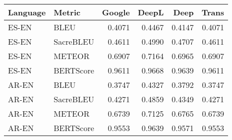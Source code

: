 \begin{table}[ht]
\centering
\begin{tabular}{llrrrr}
  \hline
Language & Metric & Google & DeepL & Deep & Trans \\ 
  \hline
ES-EN & BLEU & 0.4071 & 0.4467 & 0.4147 & 0.4071 \\ 
ES-EN & SacreBLEU & 0.4611 & 0.4990 & 0.4707 & 0.4611 \\ 
ES-EN & METEOR & 0.6907 & 0.7164 & 0.6965 & 0.6907 \\ 
ES-EN & BERTScore & 0.9611 & 0.9668 & 0.9639 & 0.9611 \\ 
AR-EN & BLEU & 0.3747 & 0.4327 & 0.3792 & 0.3747 \\ 
AR-EN & SacreBLEU & 0.4271 & 0.4859 & 0.4349 & 0.4271 \\ 
AR-EN & METEOR & 0.6739 & 0.7125 & 0.6765 & 0.6739 \\ 
AR-EN & BERTScore & 0.9553 & 0.9639 & 0.9571 & 0.9553 \\ 
   \hline
\end{tabular}
\end{table}

